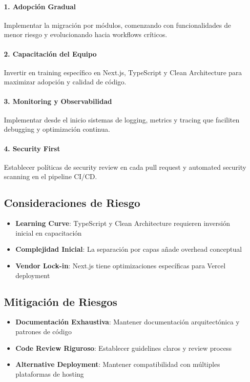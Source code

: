 \documentclass[12pt,a4paper]{article}
\begin{document}
\paragraph{1. Adopción Gradual}
Implementar la migración por módulos, comenzando con funcionalidades de menor riesgo y evolucionando hacia workflows críticos.

\paragraph{2. Capacitación del Equipo}
Invertir en training específico en Next.js, TypeScript y Clean Architecture para maximizar adopción y calidad de código.

\paragraph{3. Monitoring y Observabilidad}
Implementar desde el inicio sistemas de logging, metrics y tracing que faciliten debugging y optimización continua.

\paragraph{4. Security First}
Establecer políticas de security review en cada pull request y automated security scanning en el pipeline CI/CD.

\subsection{Consideraciones de Riesgo}

\begin{itemize}
    \item \textbf{Learning Curve}: TypeScript y Clean Architecture requieren inversión inicial en capacitación
    \item \textbf{Complejidad Inicial}: La separación por capas añade overhead conceptual
    \item \textbf{Vendor Lock-in}: Next.js tiene optimizaciones específicas para Vercel deployment
\end{itemize}

\subsection{Mitigación de Riesgos}

\begin{itemize}
    \item \textbf{Documentación Exhaustiva}: Mantener documentación arquitectónica y patrones de código
    \item \textbf{Code Review Riguroso}: Establecer guidelines claros y review process
    \item \textbf{Alternative Deployment}: Mantener compatibilidad con múltiples plataformas de hosting
\end{itemize}
\end{document}
